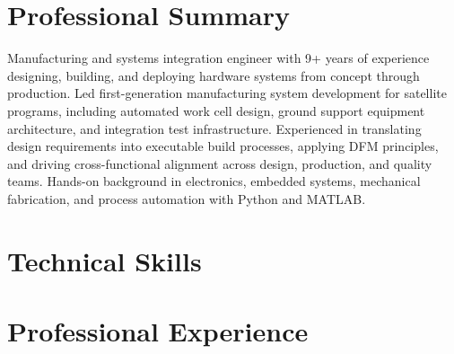 \documentclass[letterpaper,11pt]{moderncv}
\begin{document}
\makecvtitle
\vspace{-3em}

\section{Professional Summary}
Manufacturing and systems integration engineer with 9+ years of experience designing, building, and deploying hardware systems from concept through production. Led first-generation manufacturing system development for satellite programs, including automated work cell design, ground support equipment architecture, and integration test infrastructure. Experienced in translating design requirements into executable build processes, applying DFM principles, and driving cross-functional alignment across design, production, and quality teams. Hands-on background in electronics, embedded systems, mechanical fabrication, and process automation with Python and MATLAB.

\section{Technical Skills}
\begin{minipage}[t]{0.48\textwidth}
\end{minipage}%
\hfill
\begin{minipage}[t]{0.48\textwidth}
\end{minipage}

\section{Professional Experience}
\end{document}
